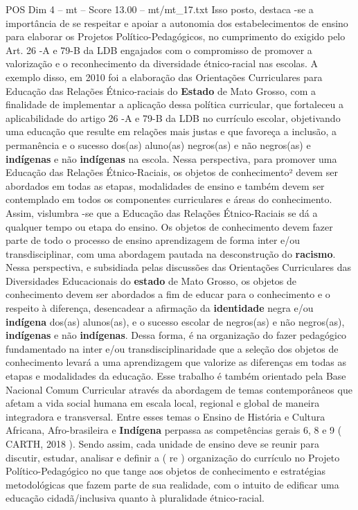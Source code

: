 \begin{textsample}{POS Dim 4 – mt – Score 13.00 – mt/mt\_17.txt}
Isso posto, destaca -se a importância de se respeitar e apoiar a autonomia dos estabelecimentos de ensino para elaborar os Projetos Político-Pedagógicos, no cumprimento do exigido pelo Art. 26 -A e 79-B da LDB engajados com o compromisso de promover a valorização e o reconhecimento da diversidade étnico-racial nas escolas.
A exemplo disso, em 2010 foi a elaboração das Orientações Curriculares para Educação das Relações Étnico-raciais do \textbf{Estado} de Mato Grosso, com a finalidade de implementar a aplicação dessa política curricular, que fortaleceu a aplicabilidade do artigo 26 -A e 79-B da LDB no currículo escolar, objetivando uma educação que resulte em relações mais justas e que favoreça a inclusão, a permanência e o sucesso dos(as) aluno(as) negros(as) e não negros(as) e \textbf{indígenas} e não \textbf{indígenas} na escola.
Nessa perspectiva, para promover uma Educação das Relações Étnico-Raciais, os objetos de conhecimento² devem ser abordados em todas as etapas, modalidades de ensino e também devem ser contemplado em todos os componentes curriculares e áreas do conhecimento.
Assim, vislumbra -se que a Educação das Relações Étnico-Raciais se dá a qualquer tempo ou etapa do ensino.
Os objetos de conhecimento devem fazer parte de todo o processo de ensino aprendizagem de forma inter e/ou transdisciplinar, com uma abordagem pautada na desconstrução do \textbf{racismo}.
Nessa perspectiva, e subsidiada pelas discussões das Orientações Curriculares das Diversidades Educacionais do \textbf{estado} de Mato Grosso, os objetos de conhecimento devem ser abordados a fim de educar para o conhecimento e o respeito à diferença, desencadear a afirmação da \textbf{identidade} negra e/ou \textbf{indígena} dos(as) alunos(as), e o sucesso escolar de negros(as) e não negros(as), \textbf{indígenas} e não \textbf{indígenas}.
Dessa forma, é na organização do fazer pedagógico fundamentado na inter e/ou transdisciplinaridade que a seleção dos objetos de conhecimento levará a uma aprendizagem que valorize as diferenças em todas as etapas e modalidades da educação.
Esse trabalho é também orientado pela Base Nacional Comum Curricular através da abordagem de temas contemporâneos que afetam a vida social humana em escala local, regional e global de maneira integradora e transversal.
Entre esses temas o Ensino de História e Cultura Africana, Afro-brasileira e \textbf{Indígena} perpassa as competências gerais 6, 8 e 9 ( CARTH, 2018 ).
Sendo assim, cada unidade de ensino deve se reunir para discutir, estudar, analisar e definir a ( re ) organização do currículo no Projeto Político-Pedagógico no que tange aos objetos de conhecimento e estratégias metodológicas que fazem parte de sua realidade, com o intuito de edificar uma educação cidadã/inclusiva quanto à pluralidade étnico-racial.

\end{textsample}
